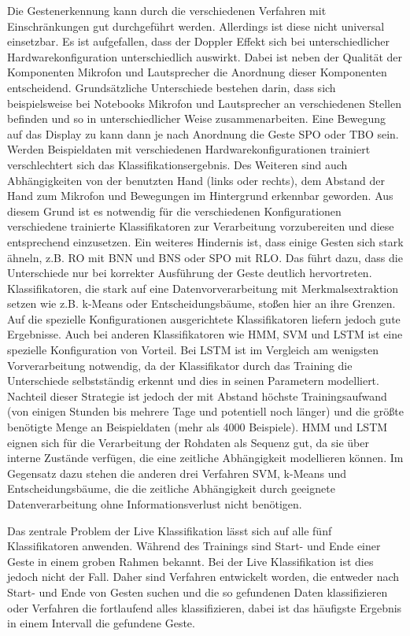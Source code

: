Die Gestenerkennung kann durch die verschiedenen Verfahren mit Einschränkungen
gut durchgeführt werden. Allerdings ist diese nicht universal einsetzbar. Es ist
aufgefallen, dass der Doppler Effekt sich bei unterschiedlicher
Hardwarekonfiguration unterschiedlich auswirkt. Dabei ist neben der Qualität der
Komponenten Mikrofon und Lautsprecher die Anordnung dieser Komponenten
entscheidend. Grundsätzliche Unterschiede bestehen darin, dass sich beispielsweise bei Notebooks Mikrofon und Lautsprecher an verschiedenen Stellen befinden und so in unterschiedlicher Weise zusammenarbeiten. Eine Bewegung auf das Display zu kann dann je nach Anordnung die Geste \acl{SPO} oder \acl{TBO} sein. Werden Beispieldaten mit verschiedenen
Hardwarekonfigurationen trainiert verschlechtert sich das
Klassifikationsergebnis. Des Weiteren sind auch Abhängigkeiten von der
benutzten Hand (links oder rechts), dem Abstand der Hand zum Mikrofon und
Bewegungen im Hintergrund erkennbar geworden. Aus diesem Grund ist es notwendig
für die verschiedenen Konfigurationen verschiedene trainierte Klassifikatoren
zur Verarbeitung vorzubereiten und diese entsprechend einzusetzen. Ein weiteres
Hindernis ist, dass einige Gesten sich stark ähneln, z.B. \ac{RO} mit \ac{BNN}
und \ac{BNS} oder \ac{SPO} mit \ac{RLO}. Das führt dazu, dass die Unterschiede
nur bei korrekter Ausführung der Geste deutlich hervortreten.
Klassifikatoren, die stark auf eine Datenvorverarbeitung mit Merkmalsextraktion
setzen wie z.B. k-Means oder Entscheidungsbäume, stoßen hier an ihre Grenzen.
Auf die spezielle Konfigurationen ausgerichtete Klassifikatoren liefern jedoch
gute Ergebnisse. Auch bei anderen Klassifikatoren wie \ac{HMM}, \ac{SVM} und
\ac{LSTM} ist eine spezielle Konfiguration von Vorteil. Bei \ac{LSTM} ist im
Vergleich am wenigsten Vorverarbeitung notwendig, da der Klassifikator durch das
Training die Unterschiede selbstständig erkennt und dies in seinen Parametern
modelliert. Nachteil dieser Strategie ist jedoch der mit Abstand höchste
Trainingsaufwand (von einigen Stunden bis mehrere Tage und potentiell noch
länger) und die größte benötigte Menge an Beispieldaten (mehr als 4000
Beispiele). \ac{HMM} und \ac{LSTM} eignen sich für die Verarbeitung der Rohdaten
als Sequenz gut, da sie über interne Zustände verfügen, die eine zeitliche
Abhängigkeit modellieren können. Im Gegensatz dazu stehen die anderen drei
Verfahren \ac{SVM}, k-Means und Entscheidungsbäume, die die zeitliche
Abhängigkeit durch geeignete Datenverarbeitung ohne Informationsverlust nicht
benötigen.

Das zentrale Problem der Live Klassifikation lässt sich auf alle fünf
Klassifikatoren anwenden. Während des Trainings sind Start- und Ende einer Geste
in einem groben Rahmen bekannt. Bei der Live Klassifikation ist dies jedoch
nicht der Fall. Daher sind Verfahren entwickelt worden, die entweder nach Start-
und Ende von Gesten suchen und die so gefundenen Daten klassifizieren oder
Verfahren die fortlaufend alles klassifizieren,
dabei ist das häufigste Ergebnis in einem Intervall die gefundene Geste.

